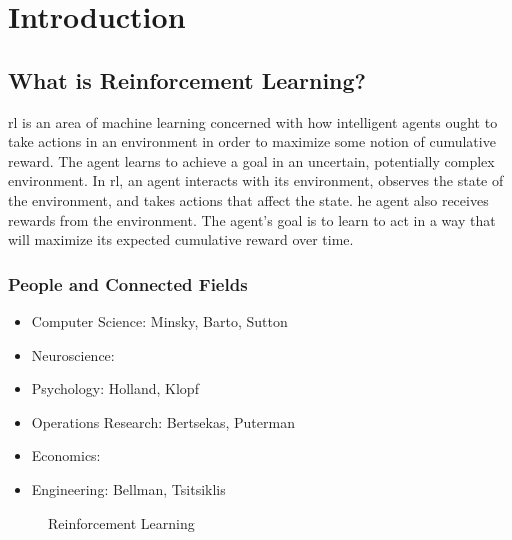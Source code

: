 \chapter{Introduction}\label{chap:introduction}
\section{What is Reinforcement Learning?}
\gls{rl} is an area of machine learning concerned with how intelligent agents ought to \bblue take actions in an environment \eblue 
in order to maximize some notion of cumulative reward. 
The agent learns to achieve a goal in an uncertain, potentially complex environment.
In \gls{rl}, an agent interacts with its environment, observes the state of the environment, and takes actions that affect the state. 
he agent also receives rewards from the environment. 
The agent's goal is to learn to act in a way that will maximize its expected cumulative reward over time.

\subsection{People and Connected Fields}
\begin{itemize}
\item Computer Science: Minsky, Barto, Sutton
\item Neuroscience:
\item Psychology: Holland, Klopf
\item Operations Research: Bertsekas, Puterman
\item Economics:
\item Engineering: Bellman, Tsitsiklis    
\end{itemize}

\begin{figure}[h!]
    \centering
    \caption{Reinforcement Learning}
    \label{fig:rl}
\end{figure}

